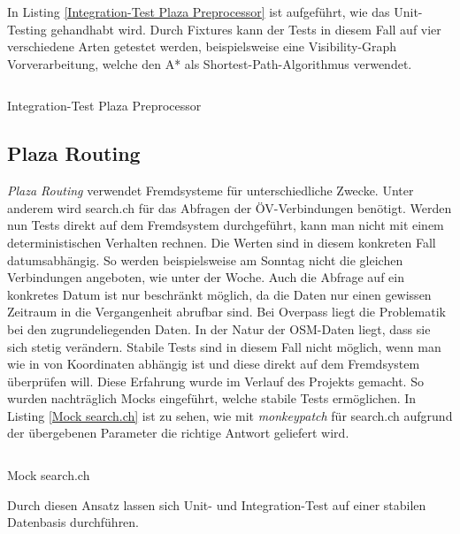 In Listing \ref{Integration-Test Plaza Preprocessor} ist aufgeführt, wie das Unit-Testing gehandhabt wird. Durch Fixtures kann der Tests in diesem Fall auf vier verschiedene Arten getestet werden, beispielsweise eine Visibility-Graph Vorverarbeitung, welche den A* \cite{astar} als Shortest-Path-Algorithmus verwendet.

\begin{listing}[ht]
    \inputminted{python}{projectdoc/listing/test_plaza_prepreprocessor.py}
    \caption{Integration-Test Plaza Preprocessor}
    \label{Integration-Test Plaza Preprocessor}
\end{listing}

\subsection{Plaza Routing}
\label{test:Plaza Routing}

\emph{Plaza Routing} verwendet Fremdsysteme für unterschiedliche Zwecke. Unter anderem wird search.ch \cite{search_ch_route_api} für das Abfragen der ÖV-Verbindungen benötigt. Werden nun Tests direkt auf dem Fremdsystem durchgeführt, kann man nicht mit einem deterministischen Verhalten rechnen. Die Werten sind in diesem konkreten Fall datumsabhängig. So werden beispielsweise am Sonntag nicht die gleichen Verbindungen angeboten, wie unter der Woche. Auch die Abfrage auf ein konkretes Datum ist nur beschränkt möglich, da die Daten nur einen gewissen Zeitraum in die Vergangenheit abrufbar sind. Bei Overpass \cite{wiki:overpass} liegt die Problematik bei den zugrundeliegenden Daten. In der Natur der \ac{OSM}-Daten liegt, dass sie sich stetig verändern. Stabile Tests sind in diesem Fall nicht möglich, wenn man wie in  von Koordinaten abhängig ist und diese direkt auf dem Fremdsystem überprüfen will. Diese Erfahrung wurde im Verlauf des Projekts gemacht. So wurden nachträglich Mocks eingeführt, welche stabile Tests ermöglichen. In Listing \ref{Mock search.ch} ist zu sehen, wie mit \emph{monkeypatch} \cite{pytest} für search.ch \cite{search_ch_route_api} aufgrund der übergebenen Parameter die richtige Antwort geliefert wird. 

\begin{listing}[ht]
    \inputminted{python}{projectdoc/listing/mock_search_ch.py}
    \caption{Mock search.ch}
    \label{Mock search.ch}
\end{listing}

Durch diesen Ansatz lassen sich Unit- und Integration-Test auf einer stabilen Datenbasis durchführen.

